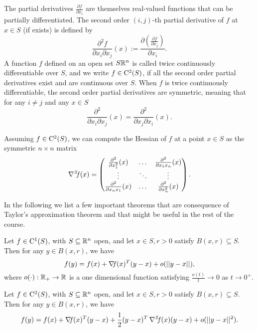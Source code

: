 \documentclass[10pt,a4paper]{article}
\begin{document}
The partial derivatives $\frac{\partial f}{\partial x_i}$ are themselves real-valued functions that can be partially differentiated. The second order $(i,j)$-th partial derivative of $f$ at $x\in S$ (if exists) is defined by
\begin{equation*}
	\frac{\partial^2 f}{\partial x_i \partial x_j}(x) := \frac{\partial \left(\frac{\partial f}{\partial x_j}\right)}{\partial x_i}.
\end{equation*}
A function $f$ defined on an open set $S \mathbb{R}^n$ is called twice continuously differentiable over $S$, and we write $f\in \mathord{\mathrm{C^2}}(S)$, if all the second order partial derivatives exist and are continuous over $S$. When $f$ is twice continuously differentiable, the second order partial derivatives are symmetric, meaning that for any $i\neq j$ and any $x\in S$
\begin{equation*}
	\frac{\partial^2}{\partial x_i \partial x_j} (x) = \frac{\partial^2}{\partial x_j \partial x_i} (x).
\end{equation*}
\begin{definition}[Hessian]
	Assuming $f\in \mathord{\mathrm{C^2}}(S)$, we can compute the Hessian of $f$ at a point $x\in S$ as the symmetric $n\times n$ matrix
	\begin{equation*}
		\operatorname*{\mathit{\nabla^2 \!f}} (x) = \begin{pmatrix}
			\frac{\partial^2}{\partial x_1^2 } (x) & \dots & \frac{\partial^2}{\partial x_1 x_n } (x)\\
			\vdots & \ddots & \vdots\\
			\frac{\partial^2}{\partial x_n x_1 } (x) & \dots & \frac{\partial^2}{\partial x_n^2 } (x)
		\end{pmatrix}
	.
	\end{equation*}
\end{definition}
In the following we list a few important theorems that are consequence of Taylor's approximation theorem and that might be useful in the rest of the course. 
\begin{theorem}
	Let $f\in \mathord{\mathrm{C^1}}(S)$, with $S\subseteq \mathbb{R}^n$ open, and let $x\in S, r>0$ satisfy $B(x,r)\subseteq S$. Then for any $y\in B(x,r)$, we have 
	\begin{equation*}
		f(y) = f(x)+ \operatorname*{\mathit{\nabla \!f}} (x)^T(y-x) + o(||y-x||),
	\end{equation*}
where $o(\cdot):\mathbb{R}_+\to \mathbb{R}$ is a one dimensional function satisfying $\frac{o(t)}{t} \to 0$ as $t\to0^+$.
\end{theorem}
\begin{theorem}
Let $f\in \mathord{\mathrm{C^2}}(S)$, with $S\subseteq \mathbb{R}^n$ open, and let $x\in S, r>0$ satisfy $B(x,r)\subseteq S$. Then for any $y\in B(x,r)$, we have 
\begin{equation*}
	f(y) = f(x)+ \operatorname*{\mathit{\nabla \!f}} (x)^T(y-x) +\frac{1}{2}(y-x)^T\operatorname*{\mathit{\nabla^2 \!f}}(x)(y-x) +  o(||y-x||^2).
\end{equation*}
\end{theorem}
\end{document}
